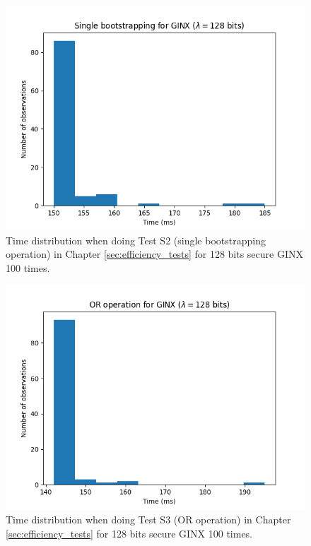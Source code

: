 \begin{figure}[ht]
    \centering
    \includegraphics[width=0.8\linewidth]{data/figures/GINX_STD128_Single_bootstrapping.png}
    \caption{Time distribution when doing Test S2 (single bootstrapping operation) in Chapter \ref{sec:efficiency_tests} for 128 bits secure GINX 100 times.}
    \label{fig:distr_ginx128_bs}
\end{figure}

\begin{figure}[ht]
    \centering
    \includegraphics[width=0.8\linewidth]{data/figures/GINX_STD128_OR_operation.png}
    \caption{Time distribution when doing Test S3 (OR operation) in Chapter \ref{sec:efficiency_tests} for 128 bits secure GINX 100 times.}
    \label{fig:distr_ginx128_or}
\end{figure}

